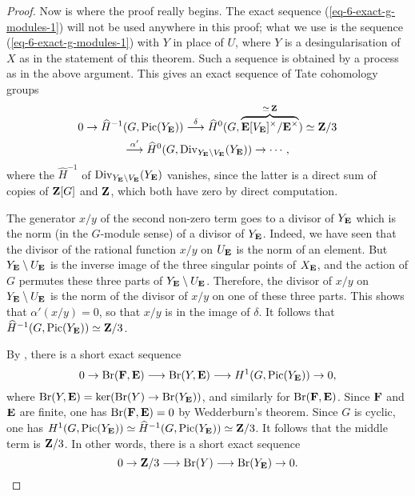\begin{proof}
    Now is where the proof really begins.
    The exact sequence (\ref{eq-6-exact-g-modules-1})
    will not be used anywhere in this proof;
    what we use is the sequence (\ref{eq-6-exact-g-modules-1})
    with $Y$ in place of $U$, where $Y$ is a desingularisation of $X$
    as in the statement of this theorem. 
    Such a sequence is obtained by a process as in the above argument.
    This gives an exact sequence of Tate cohomology groups
    \begin{multline*}
        0 \to \widehat{H}^{-1} (G, \operatorname{Pic}(Y_{\bbE}))
        \overset{\delta}{\longrightarrow} 
        \widehat{H}^{0} (G, \overbrace{\bbE[V_{\bbE}]{}^\times / \bbE{}^\times}^{\simeq \, \bbZ})
        \simeq \bbZ/3 \\
        \overset{\alpha'}{\longrightarrow} \widehat{H}^{0} (G, \operatorname{Div}_{Y_{\bbE} \setminus V_{\bbE}} (Y_{\bbE}) )
        \to \cdots,
    \end{multline*} 
    where the $\widehat{H}^{-1}$ of $\operatorname{Div}_{Y_{\bbE} \setminus V_{\bbE}} (Y_{\bbE})$
    vanishes, since the latter is a direct sum of copies of $\bbZ[G]$ and $\bbZ$, 
    which both have zero  by direct computation.

    The generator $x/y$ of the second non-zero term
    goes to a divisor of $Y_{\bbE}$ which is the norm 
    (in the $G$-module sense) of a divisor of $Y_{\bbE}$. 
    Indeed, we have seen that the divisor of the rational function $x/y$ on $U_{\bbE}$ is the norm of an element.
    But $Y_{\bbE} \setminus U_{\bbE}$ is the inverse image of the three singular points of $X_{\bbE}$,
    and the action of $G$ permutes these three parts of $Y_{\bbE} \setminus U_{\bbE}$.
    Therefore, the divisor of $x/y$ on $Y_{\bbE} \setminus U_{\bbE}$ is the norm
    of the divisor of $x/y$ on one of these three parts.
    This shows that $\alpha'(x/y) = 0$, so that $x/y$ is in the image of $\delta$.
    It follows that $\widehat{H}^{-1} (G, \operatorname{Pic}(Y_{\bbE})) \simeq \bbZ/3$.

    By \cite[Lemma~15]{colliot-sansuc}, there is a short exact sequence
    \[ 0 \to \Br(\bbF, \bbE)
        \longrightarrow \Br(Y, \bbE)
        \longrightarrow H^1 (G, \operatorname{Pic}(Y_{\bbE})) \to 0, \]
    where $\Br (Y, \bbE) = \ker (\Br(Y) \to \Br(Y_{\bbE}))$,
    and similarly for $\Br (\bbF, \bbE)$.
    Since $\bbF$ and $\bbE$ are finite, one has $\Br(\bbF, \bbE) = 0$
    by Wedderburn's theorem.
    Since $G$ is cyclic, one has 
    $H^1 (G, \operatorname{Pic}(Y_{\bbE})) \simeq \widehat{H}^{-1} (G, \operatorname{Pic}(Y_{\bbE})) \simeq \bbZ/3$.
    It follows that the middle term is $\bbZ/3$. 
    In other words, there is a short exact sequence
    \[ 0 \to \bbZ/3 
        \longrightarrow \Br(Y)
        \longrightarrow \Br(Y_{\bbE}) \to 0. \]


\end{proof}
